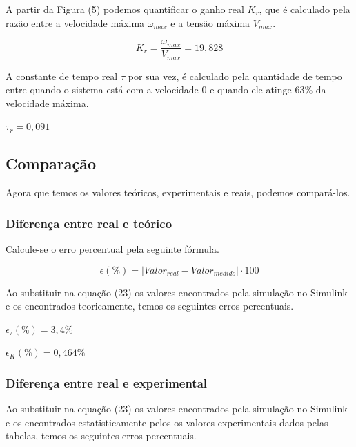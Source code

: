 \documentclass[12pt]{article}
\begin{document}
\quad A partir da Figura (5) podemos quantificar o ganho real $K_r$, que é calculado pela razão entre a velocidade máxima $\omega_{max}$ e a tensão máxima $V_{max}$. 

\begin{equation}
    K_r = \frac{\omega_{max}}{V_{max}} = 19,828
\end{equation}

\quad A constante de tempo real $\tau$ por sua vez, é calculado pela quantidade de tempo entre quando o sistema está com a velocidade 0 e quando ele atinge $63\%$ da velocidade máxima. 

\begin{center}
    $\tau_r = 0,091$
\end{center}

\subsection{Comparação}

\quad Agora que temos os valores teóricos, experimentais e reais, podemos compará-los.

\subsubsection{Diferença entre real e teórico}

\quad Calcule-se o erro percentual pela seguinte fórmula.

\begin{equation}
     \epsilon (\%) = |Valor_{real} - Valor_{medido}|\cdot 100
\end{equation}

\quad Ao substituir na equação (23) os valores encontrados pela simulação no Simulink e os encontrados teoricamente, temos os seguintes erros percentuais.

\begin{center}
      $\epsilon_{\tau}(\%)  = 3,4 \%$
\end{center}

\begin{center}
      $\epsilon_{K}(\%) = 0,464\%$
\end{center}

\subsubsection{Diferença entre real e experimental}

\quad Ao substituir na equação (23) os valores encontrados pela simulação no Simulink e os encontrados estatisticamente pelos os valores experimentais dados pelas tabelas, temos os seguintes erros percentuais.
\end{document}

